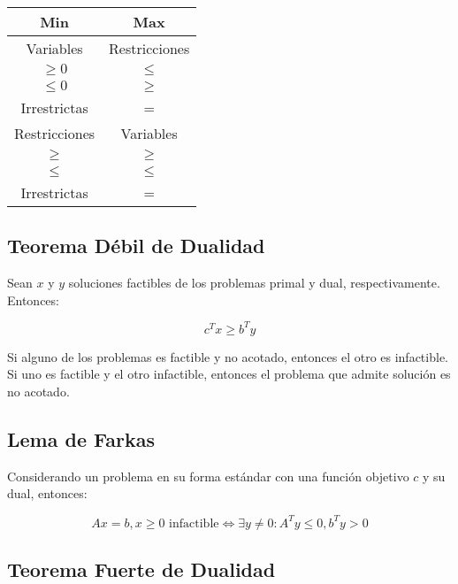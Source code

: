 \documentclass{article}
\begin{document}
\begin{center}
    \begin{tabular}{|c|c|}
        \hline
        Min & Max \\
        \hline
        \hline
        Variables & Restricciones \\
        \hline
        $\geq 0$ & $\leq$ \\
        $\leq 0$ & $\geq$ \\
        Irrestrictas & = \\
        \hline
        \hline
        Restricciones & Variables \\
        \hline
        $\geq$ & $\geq$ \\
        $\leq$ & $\leq$ \\
        Irrestrictas & = \\
        \hline
    \end{tabular}
\end{center}

\subsection{Teorema Débil de Dualidad}

Sean $x$ y $y$ soluciones factibles de los problemas primal y dual, respectivamente. Entonces:

\begin{equation*}
    c^T x \geq b^T y
\end{equation*}

Si alguno de los problemas es factible y no acotado, entonces el otro es infactible. Si uno es factible y el otro infactible, entonces el problema que admite solución es no acotado.

\subsection{Lema de Farkas}

Considerando un problema en su forma estándar con una función objetivo $c$ y su dual, entonces:

\begin{equation*}
    Ax=b, x\geq 0 \text{ infactible} \iff \exists y \neq 0: A^T y \leq 0, b^T y > 0
\end{equation*}

\subsection{Teorema Fuerte de Dualidad}
\end{document}
